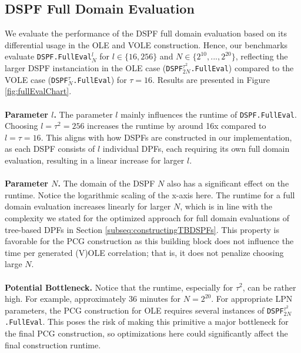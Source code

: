 \subsection{DSPF Full Domain Evaluation}
\label{subsec:evalDspfFullDomain}
We evaluate the performance of the DSPF full domain evaluation based on its differential usage in the OLE and VOLE construction. Hence, our benchmarks evaluate \texttt{DSPF.FullEval}$_N^l$ for $l\in\{16,256\}$ and $N\in\{2^{10}, ..., 2^{20}\}$, reflecting the larger DSPF instanciation in the OLE case (\texttt{DSPF}$^{\tau^2}_{2N}$\texttt{.FullEval}) compared to the VOLE case (\texttt{DSPF}$^{\tau}_{N}$\texttt{.FullEval}) for $\tau=16$. Results are presented in Figure \ref{fig:fullEvalChart}.
\\\\
\textbf{Parameter $l$.} The parameter $l$ mainly influences the runtime of \texttt{DSPF.FullEval}. Choosing $l=\tau^2=256$ increases the runtime by around 16x compared to $l=\tau=16$. This aligns with how DSPFs are constructed in our implementation, as each DSPF consists of $l$ individual DPFs, each requiring its own full domain evaluation, resulting in a linear increase for larger $l$.
\\\\
\textbf{Parameter $N$.} The domain of the DSPF $N$ also has a significant effect on the runtime. Notice the logarithmic scaling of the x-axis here. The runtime for a full domain evaluation increases linearly for larger $N$, which is in line with the complexity we stated for the optimized approach for full domain evaluations of tree-based DPFs in Section \ref{subseq:constructingTBDSPFs}. This property is favorable for the PCG construction as this building block does not influence the time per generated (V)OLE correlation; that is, it does not penalize choosing large $N$.
\\\\
\textbf{Potential Bottleneck.} Notice that the runtime, especially for $\tau^2$, can be rather high. For example, approximately 36 minutes for $N=2^{20}$. For appropriate LPN parameters, the PCG construction for OLE requires several instances of \texttt{DSPF}$^{\tau^2}_{2N}$\texttt{.FullEval}. This poses the risk of making this primitive a major bottleneck for the final PCG construction, so optimizations here could significantly affect the final construction runtime.
\\\\

